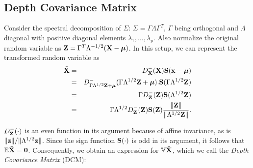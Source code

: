 
\subsection{Depth Covariance Matrix}
\label{subsec:dcm}
Consider the spectral decomposition of $\Sigma$: $\Sigma = \Gamma\Lambda\Gamma^T$, $\Gamma$ being orthogonal and $\Lambda$ diagonal with positive diagonal elements $\lambda_1, \ldots, \lambda_p$. Also normalize the original random variable as ${\mathbf{Z}} = \Gamma^T\Lambda^{-1/2} ({\mathbf{X}} - {\boldsymbol{\mu}})$. In this setup, we can represent the transformed random variable as
%
\begin{eqnarray}
\tilde {{\mathbf{X}}} &=& D^-_{{\mathbf{X}}} ({\mathbf{X}}) {\mathbf{S}}({\bf{x}} - {\boldsymbol{\mu}}) \notag \\
&=& D^-_{\Gamma\Lambda^{1/2}{\mathbf{Z}} + {\boldsymbol{\mu}}} (\Gamma\Lambda^{1/2} {\mathbf{Z}} + {\boldsymbol{\mu}}). {\mathbf{S}}(\Gamma\Lambda^{1/2} {\mathbf{Z}}) \notag \\
&=& \Gamma D^-_{{\mathbf{Z}}}({\mathbf{Z}}) {\mathbf{S}}(\Lambda^{1/2}{\mathbf{Z}}) \notag \\
&=& \Gamma \Lambda^{1/2} D^-_{{\mathbf{Z}}}({\mathbf{Z}}) {\mathbf{S}}({\mathbf{Z}}) \frac{\| {\mathbf{Z}} \|}{\|\Lambda^{1/2} {\mathbf{Z}} \|}.
\label{equation:rankdecomp}
\end{eqnarray}
%

$D^-_{\mathbf{Z}}(\cdot)$ is an even function in its argument because of affine invariance, as is $\| {\bf{z}} \| / \|\Lambda^{1/2} {\bf{z}} \|$. Since the sign function ${\mathbf{S}}(\cdot)$ is odd in its argument, it follows that ${\mathbb{E}} \tilde {{\mathbf{X}}} = \bf0$. Consequently, we obtain an expression for ${\mathbb{V}} \tilde {{\mathbf{X}}}$, which we call the {\it Depth Covariance Matrix} (DCM):

